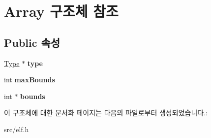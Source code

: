 \hypertarget{struct_array}{}\section{Array 구조체 참조}
\label{struct_array}
\subsection*{Public 속성}
\begin{DoxyCompactItemize}
\item 
\mbox{\label{struct_array_aebd7ba43475f7f6461e4343a7ffce0a7}} 
\mbox{\hyperlink{struct_type}{Type}} $\ast$ {\bfseries type}
\item 
\mbox{\label{struct_array_ac416f8022b0d22cb470b0e5cc1e9b356}} 
int {\bfseries max\+Bounds}
\item 
\mbox{\label{struct_array_a2d2cd201a0203a12d6f5e7b8a34ab1ad}} 
int $\ast$ {\bfseries bounds}
\end{DoxyCompactItemize}


이 구조체에 대한 문서화 페이지는 다음의 파일로부터 생성되었습니다.\+:\begin{DoxyCompactItemize}
\item 
src/elf.\+h\end{DoxyCompactItemize}
